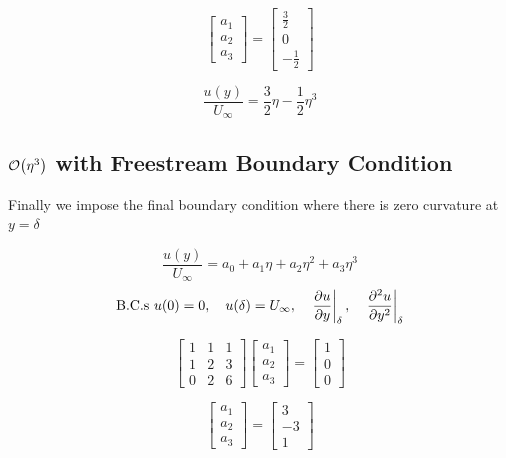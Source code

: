 \documentclass{report}
\begin{document}
\begin{equation}
   \begin{bmatrix}
      a_1 \\
      a_2 \\
      a_3
   \end{bmatrix}
   =
   \begin{bmatrix}
      \frac{3}{2} \\
      0 \\
      -\frac{1}{2}
   \end{bmatrix}
\end{equation}

\begin{equation}
   \frac{u(y)}{U_{\infty}} = \frac{3}{2}\eta - \frac{1}{2}\eta^3
\end{equation}

\subsection{$\order{\eta^3}$ with Freestream Boundary Condition}

Finally we impose the final boundary condition where there is zero curvature at $y = \delta$

\begin{equation}
   \frac{u(y)}{U_{\infty}} = a_0 + a_1\eta + a_2\eta^2 + a_3\eta^3
   \label{parab}
\end{equation}
\begin{equation*}
   \text{B.C.s } u(0) = 0, \quad u(\delta) = U_{\infty}, \quad \eval{\pdv{u}{y}}_{\delta}, \quad \eval{\pdv[2]{u}{y}}_{\delta}
\end{equation*}

\begin{equation}
   \begin{bmatrix}
      1 & 1 & 1 \\
      1 & 2 & 3 \\
      0 & 2 & 6
   \end{bmatrix}
   \begin{bmatrix}
      a_1 \\
      a_2 \\
      a_3
   \end{bmatrix} =
   \begin{bmatrix}
      1 \\
      0 \\
      0
   \end{bmatrix}
\end{equation}


\begin{equation}
   \begin{bmatrix}
      a_1 \\
      a_2 \\
      a_3
   \end{bmatrix}
   =
   \begin{bmatrix}
      3 \\
      -3 \\
      1
   \end{bmatrix}
\end{equation}
\end{document}

